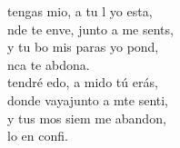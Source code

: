 \documentclass[12pt]{article}
\begin{document}
\begin{multicols*}{2}
\begin{cancion}
	\begin{chorus}%
	 tengas mio, a tu l yo esta,\\
	nde te enve, junto a me sents, \\
	y  tu bo mis paras yo pond,\\
	nca te abdona.\\
	 tendré edo, a mido tú erás,\\
	donde vayajunto a mte senti,\\
	y  tus mos siem me abandon, \\
	lo en  confi. \\
	\end{chorus}%
	\jump\\
\end{cancion}%


\end{multicols*}
\end{document}
